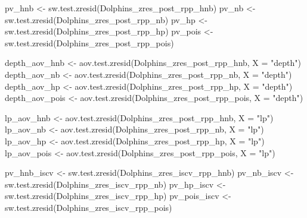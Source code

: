\documentclass[
  english,
  letterpaper,
  DIV=11,
  numbers=noendperiod]{scrartcl}
\newenvironment{Shaded}{\begin{snugshade}}{\end{snugshade}}
\newcommand{\AttributeTok}[1]{\textcolor[rgb]{0.40,0.45,0.13}{#1}}
\newcommand{\FunctionTok}[1]{\textcolor[rgb]{0.28,0.35,0.67}{#1}}
\newcommand{\NormalTok}[1]{\textcolor[rgb]{0.00,0.23,0.31}{#1}}
\newcommand{\OtherTok}[1]{\textcolor[rgb]{0.00,0.23,0.31}{#1}}
\newcommand{\StringTok}[1]{\textcolor[rgb]{0.13,0.47,0.30}{#1}}
\begin{document}
\begin{Shaded}
\begin{Highlighting}[]
\NormalTok{pv\_hnb  }\OtherTok{\textless{}{-}} \FunctionTok{sw.test.zresid}\NormalTok{(Dolphins\_zres\_post\_rpp\_hnb)}
\NormalTok{pv\_nb   }\OtherTok{\textless{}{-}} \FunctionTok{sw.test.zresid}\NormalTok{(Dolphins\_zres\_post\_rpp\_nb)}
\NormalTok{pv\_hp   }\OtherTok{\textless{}{-}} \FunctionTok{sw.test.zresid}\NormalTok{(Dolphins\_zres\_post\_rpp\_hp)}
\NormalTok{pv\_pois }\OtherTok{\textless{}{-}} \FunctionTok{sw.test.zresid}\NormalTok{(Dolphins\_zres\_post\_rpp\_pois)}

\NormalTok{depth\_aov\_hnb  }\OtherTok{\textless{}{-}} \FunctionTok{aov.test.zresid}\NormalTok{(Dolphins\_zres\_post\_rpp\_hnb,  }\AttributeTok{X =} \StringTok{"depth"}\NormalTok{)}
\NormalTok{depth\_aov\_nb   }\OtherTok{\textless{}{-}} \FunctionTok{aov.test.zresid}\NormalTok{(Dolphins\_zres\_post\_rpp\_nb,   }\AttributeTok{X =} \StringTok{"depth"}\NormalTok{)}
\NormalTok{depth\_aov\_hp   }\OtherTok{\textless{}{-}} \FunctionTok{aov.test.zresid}\NormalTok{(Dolphins\_zres\_post\_rpp\_hp,   }\AttributeTok{X =} \StringTok{"depth"}\NormalTok{)}
\NormalTok{depth\_aov\_pois }\OtherTok{\textless{}{-}} \FunctionTok{aov.test.zresid}\NormalTok{(Dolphins\_zres\_post\_rpp\_pois, }\AttributeTok{X =} \StringTok{"depth"}\NormalTok{)}

\NormalTok{lp\_aov\_hnb  }\OtherTok{\textless{}{-}} \FunctionTok{aov.test.zresid}\NormalTok{(Dolphins\_zres\_post\_rpp\_hnb,  }\AttributeTok{X =} \StringTok{"lp"}\NormalTok{)}
\NormalTok{lp\_aov\_nb   }\OtherTok{\textless{}{-}} \FunctionTok{aov.test.zresid}\NormalTok{(Dolphins\_zres\_post\_rpp\_nb,   }\AttributeTok{X =} \StringTok{"lp"}\NormalTok{)}
\NormalTok{lp\_aov\_hp   }\OtherTok{\textless{}{-}} \FunctionTok{aov.test.zresid}\NormalTok{(Dolphins\_zres\_post\_rpp\_hp,   }\AttributeTok{X =} \StringTok{"lp"}\NormalTok{)}
\NormalTok{lp\_aov\_pois }\OtherTok{\textless{}{-}} \FunctionTok{aov.test.zresid}\NormalTok{(Dolphins\_zres\_post\_rpp\_pois, }\AttributeTok{X =} \StringTok{"lp"}\NormalTok{)}

\NormalTok{pv\_hnb\_iscv  }\OtherTok{\textless{}{-}} \FunctionTok{sw.test.zresid}\NormalTok{(Dolphins\_zres\_iscv\_rpp\_hnb)}
\NormalTok{pv\_nb\_iscv   }\OtherTok{\textless{}{-}} \FunctionTok{sw.test.zresid}\NormalTok{(Dolphins\_zres\_iscv\_rpp\_nb)}
\NormalTok{pv\_hp\_iscv   }\OtherTok{\textless{}{-}} \FunctionTok{sw.test.zresid}\NormalTok{(Dolphins\_zres\_iscv\_rpp\_hp)}
\NormalTok{pv\_pois\_iscv }\OtherTok{\textless{}{-}} \FunctionTok{sw.test.zresid}\NormalTok{(Dolphins\_zres\_iscv\_rpp\_pois)}


\end{Highlighting}
\end{Shaded}
\end{document}

